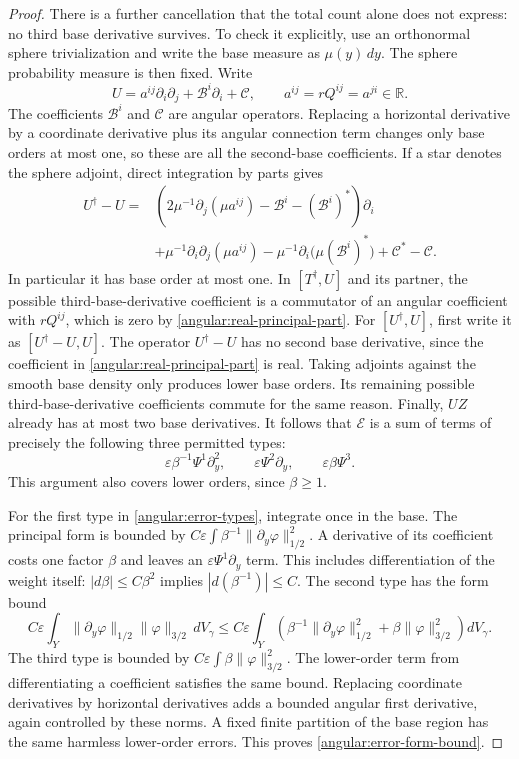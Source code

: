 \documentclass[11pt]{article}
\theoremstyle{definition}
\theoremstyle{remark}
\newcommand{\eps}{\varepsilon}
\numberwithin{equation}{section}
\begin{document}
\begin{proof}
There is a further cancellation that the total count alone does not
express: no third base derivative survives.  To check it explicitly,
use an orthonormal sphere trivialization and write the base measure as
$\mu(y)\,dy$.  The sphere probability measure is then fixed.  Write
\[
 U=a^{ij}\partial_i\partial_j+\mathcal B^i\partial_i+\mathcal C,
 \qquad a^{ij}=rQ^{ij}=a^{ji}\in\mathbb R.
\]
The coefficients $\mathcal B^i$ and $\mathcal C$ are angular
operators.  Replacing a horizontal derivative by a coordinate derivative
plus its angular connection term changes only base orders at most one,
so these are all the second-base coefficients.  If a star denotes the
sphere adjoint, direct integration by parts gives
\begin{align*}
 U^\dagger-U
 ={}&\left(2\mu^{-1}\partial_j(\mu a^{ij})
                -\mathcal B^i-(\mathcal B^i)^*\right)\partial_i\\
 &+\mu^{-1}\partial_i\partial_j(\mu a^{ij})
       -\mu^{-1}\partial_i\bigl(\mu(\mathcal B^i)^*\bigr)
       +\mathcal C^*-\mathcal C.
\end{align*}
In particular it has base order at most one.
In $[T^\dagger,U]$ and
its partner, the possible third-base-derivative coefficient is a commutator of an angular coefficient
with $rQ^{ij}$, which is zero by
\eqref{angular:real-principal-part}.  For $[U^\dagger,U]$, first write
it as $[U^\dagger-U,U]$.  The operator $U^\dagger-U$ has no second base
derivative, since the coefficient in
\eqref{angular:real-principal-part} is real.  Taking adjoints against
the smooth base density only produces lower base orders.  Its remaining
possible third-base-derivative coefficients commute for the same reason.
Finally, $UZ$ already has at most two base derivatives.
It follows that $\mathcal E$ is a sum of terms of precisely the following
three permitted types:
\begin{equation}\label{angular:error-types}
 \eps\beta^{-1}\Psi^1\partial_y^2,
 \qquad \eps\Psi^2\partial_y,
 \qquad \eps\beta\Psi^3.
\end{equation}
This argument also covers lower orders, since $\beta\ge1$.

For the first type in \eqref{angular:error-types}, integrate once in the
base.  The principal form is bounded by
$C\eps\int\beta^{-1}\|\partial_y\varphi\|_{1/2}^2$.
A derivative of its coefficient costs one factor $\beta$ and leaves an
$\eps\Psi^1\partial_y$ term.  This includes differentiation of the
weight itself: $|d\beta|\le C\beta^2$ implies
$|d(\beta^{-1})|\le C$.  The second type has the form bound
\[
 C\eps\int_Y
     \|\partial_y\varphi\|_{1/2}\|\varphi\|_{3/2}\,dV_\gamma
 \le C\eps\int_Y\left(
     \beta^{-1}\|\partial_y\varphi\|_{1/2}^2
                 +\beta\|\varphi\|_{3/2}^2\right)dV_\gamma.
\]
The third type is bounded by
$C\eps\int\beta\|\varphi\|_{3/2}^2$.
The lower-order term from differentiating a coefficient satisfies the
same bound.  Replacing coordinate derivatives by horizontal derivatives
adds a bounded angular first derivative, again controlled by these norms.
A fixed finite partition of the base region has the same harmless
lower-order errors.  This proves \eqref{angular:error-form-bound}.


\end{proof}
\end{document}
